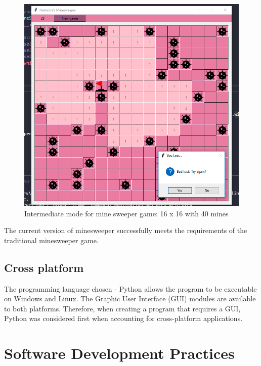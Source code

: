\documentclass[12pt, a4]{report}
\begin{document}
		\begin{figure}[!h]
			\centering
			\includegraphics[scale=0.7]{game}
			\caption{Intermediate mode for mine sweeper game: 16 x 16 with 40 mines}
		\end{figure}
	\par The current  version of minesweeper successfully meets the requirements of the traditional minesweeper game. 
 
		\newpage
	\subsection{Cross platform}
	\par The programming language chosen - Python allows the program to be executable on Windows and Linux. The Graphic User Interface (GUI) modules are available to both platforms. Therefore, when creating a program that requires a GUI, Python was considered first when accounting for cross-platform applications. 
	
	\section{Software Development Practices}
\end{document}
